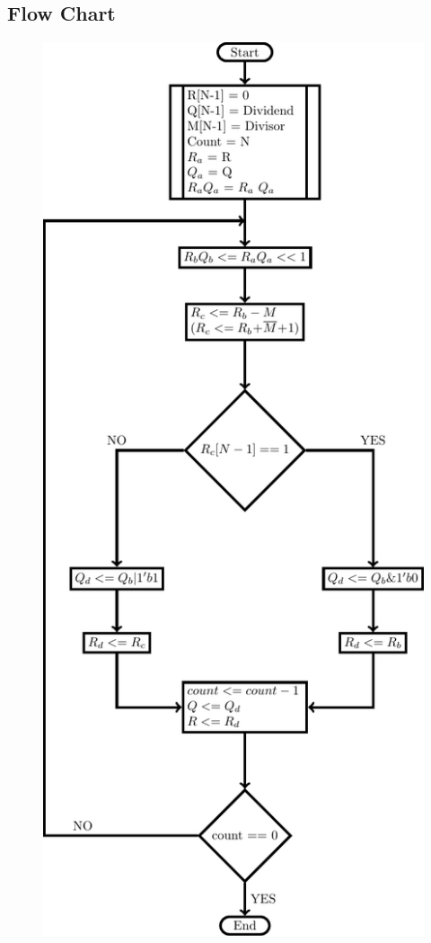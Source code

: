 \documentclass{article}
\begin{document}
\subsection{Flow Chart}
\begin{figure}[H]
    \centering
    \includegraphics[scale=0.9]{../Resources/TexFiles/RestoringDivision.pdf}
\end{figure}
\end{document}
